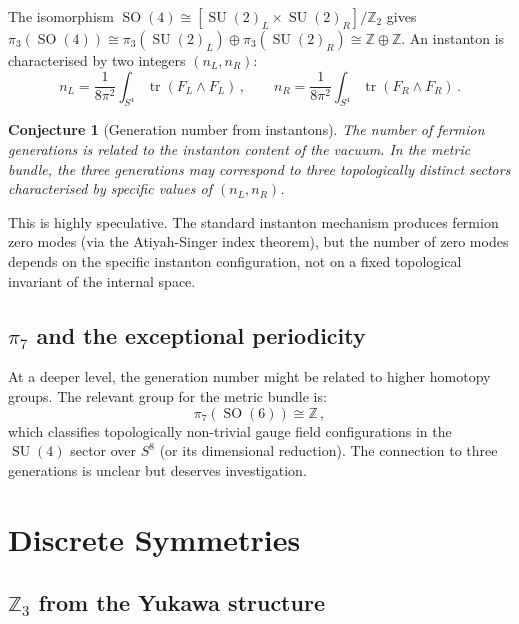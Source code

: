 \documentclass[12pt,a4paper]{article}
\newtheorem{conjecture}[theorem]{Conjecture}
\theoremstyle{definition}
\newcommand{\tr}{\operatorname{tr}}
\newcommand{\SO}{\operatorname{SO}}
\newcommand{\SU}{\operatorname{SU}}
\newcommand{\Z}{\mathbb{Z}}
\begin{document}
The isomorphism $\SO(4) \cong [\SU(2)_L \times \SU(2)_R]/\Z_2$ gives $\pi_3(\SO(4)) \cong \pi_3(\SU(2)_L) \oplus \pi_3(\SU(2)_R) \cong \Z \oplus \Z$.
An instanton is characterised by two integers $(n_L, n_R)$:
\begin{equation}
n_L = \frac{1}{8\pi^2} \int_{S^4} \tr(F_L \wedge F_L)\,,\qquad n_R = \frac{1}{8\pi^2} \int_{S^4} \tr(F_R \wedge F_R)\,.
\end{equation}

\begin{conjecture}[Generation number from instantons]
\label{conj:instanton}
The number of fermion generations is related to the instanton content of the vacuum.
In the metric bundle, the three generations may correspond to three topologically distinct sectors characterised by specific values of $(n_L, n_R)$.
\end{conjecture}

This is highly speculative.
The standard instanton mechanism produces fermion zero modes (via the Atiyah-Singer index theorem), but the number of zero modes depends on the specific instanton configuration, not on a fixed topological invariant of the internal space.

\subsection{\texorpdfstring{$\pi_7$}{pi7} and the exceptional periodicity}

At a deeper level, the generation number might be related to higher homotopy groups.
The relevant group for the metric bundle is:
\begin{equation}
\pi_7(\SO(6)) \cong \Z\,,
\end{equation}
which classifies topologically non-trivial gauge field configurations in the $\SU(4)$ sector over $S^8$ (or its dimensional reduction).
The connection to three generations is unclear but deserves investigation.


\section{Discrete Symmetries}
\label{sec:discrete}

\subsection{\texorpdfstring{$\Z_3$}{Z3} from the Yukawa structure}
\end{document}
